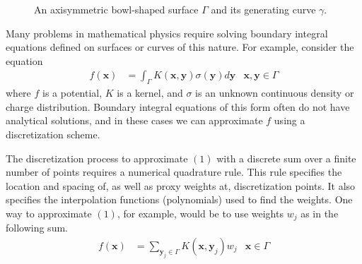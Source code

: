\documentclass[11pt, oneside]{article}   	%
\begin{document}
\begin{figure}[h]
\caption{An axisymmetric bowl-shaped surface $\Gamma$ and its generating curve $\gamma$.}
\label{fig:1}
\centering
\end{figure}

Many problems in mathematical physics require solving boundary integral equations defined on surfaces or curves of this nature. For example, consider the equation
\begin{align}
f(\mathbf{x}) &= \int_\Gamma K(\mathbf{x},\mathbf{y})\sigma(\mathbf{y})d\mathbf{y} &\mathbf{x},\mathbf{y}\in\Gamma
\end{align}
where $f$ is a potential, $K$ is a kernel, and $\sigma$ is an unknown continuous density or charge distribution. Boundary integral equations of this form often do not have analytical solutions, and in these cases we can approximate $f$ using a discretization scheme.

The discretization process to approximate $(1)$ with a discrete sum over a finite number of points requires a numerical quadrature rule. This rule specifies the location and spacing of, as well as proxy weights at, discretization points. It also specifies the interpolation functions (polynomials) used to find the weights. One way to approximate $(1)$, for example, would be to use weights $w_j$ as in the following sum.
\begin{align}
f(\mathbf{x}) &= \sum_{\mathbf{y}_j\in\Gamma} K(\mathbf{x},\mathbf{y}_j)w_j &\mathbf{x}\in\Gamma
\end{align}
\end{document}
